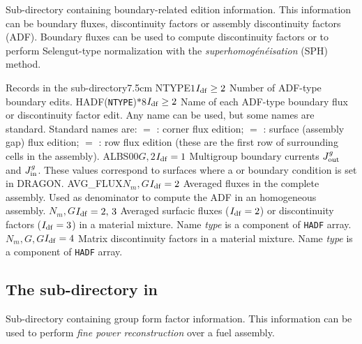 Sub-directory containing boundary-related edition information. This information can be boundary fluxes, discontinuity factors or
assembly discontinuity factors (ADF). Boundary fluxes can be used to compute discontinuity factors or to perform Selengut-type
normalization with the {\sl superhomog\'en\'eisation} (SPH) method.

\begin{DescriptionEnregistrement}{Records in the  sub-directory}{7.5cm}
\OptIntEnr
  {NTYPE}{$1$}{$I_{\rm df} \ge 2$}
  {Number of ADF-type boundary edits.}
\OptCharEnr
  {HADF}{({\tt NTYPE})$*8$}{$I_{\rm df} \ge 2$}
  {Name of each ADF-type boundary flux or discontinuity factor edit. Any name can be used, but some
  names are standard. Standard names are: $=$ :
  corner flux edition; $=$ : surface (assembly gap) flux edition; $=$ :
  row flux edition (these are the first row of surrounding cells in the assembly).}
\OptRealEnr
  {ALBS00}{$G,2$}{$I_{\rm df} = 1$}{}
  {Multigroup boundary currents $J^{g}_{\rm out}$ and $J^{g}_{\rm in}$. These values correspond to surfaces where
  a  or  boundary condition is set in DRAGON.}
\OptRealEnr
  {AVG\_FLUX}{$N_{m},G$}{$I_{\rm df} = 2$}{}
  {Averaged fluxes in the complete assembly. Used as denominator to compute the ADF in an homogeneous assembly.}
\OptRealVar
  {}{$N_{m},G$}{$I_{\rm df} = 2,\, 3$}{}
  {Averaged surfacic fluxes ($I_{\rm df} = 2$) or discontinuity factors ($I_{\rm df} = 3$) in a material mixture. Name {\sl type} is a component of
  {\tt HADF} array.}
\OptRealVar
  {}{$N_{m},G,G$}{$I_{\rm df} = 4$}{}
  {Matrix discontinuity factors in a material mixture. Name {\sl type} is a component of {\tt HADF} array.}
\end{DescriptionEnregistrement}

\subsection{The  sub-directory in }\label{sect:macroGFF}

Sub-directory containing group form factor information. This information can be used to perform
{\sl fine power reconstruction} over a fuel assembly.

